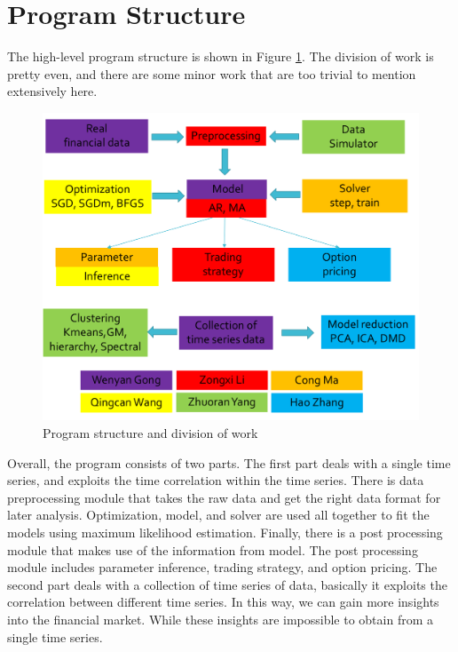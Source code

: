 \documentclass[12pt,a4paper]{article}
\begin{document}
\section{Program Structure}
The high-level program structure is shown in Figure \ref{fig:structure}. The division of work is pretty even, and there are some minor work that are too trivial to mention extensively here. 
\begin{figure}[htp]
        \centering
     \includegraphics[width=.8\linewidth]{./Figure/structure.png}
\caption{Program structure and division of work}
\label{fig:structure}
\end{figure}
Overall, the program consists of two parts. The first part deals with a single time series, and exploits the time correlation within the time series. There is data preprocessing module that takes the raw data and get the right data format for later analysis. Optimization, model, and solver are used all together to fit the models using maximum likelihood estimation. Finally, there is a post processing module that makes use of the information from model. The post processing module includes parameter inference, trading strategy, and option pricing. The second part deals with a collection of time series of data, basically it exploits the correlation between different time series. In this way, we can gain more insights into the financial market. While these insights are impossible to obtain from a single time series.
\end{document}
